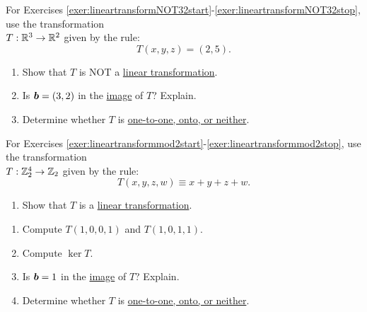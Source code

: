 \begin{multicols}{2}
\noindent For Exercises \ref{exer:lineartransformNOT32start}-\ref{exer:lineartransformNOT32stop}, use the transformation\\ $T : \mathbb{R}^3 \to \mathbb{R}^2$ given by the rule:
\[T(x, y, z) = (2,5).\] 
\begin{enumerate}[!HW!]
\item\label{exer:lineartransformNOT32start} Show that $T$ is NOT a \hyperref[def:linear]{linear transformation}.
\item Is $\boldsymbol b = (3,2)$ in the \hyperref[def:linear]{image} of $T$? Explain. 
\item\label{exer:lineartransformNOT32stop} Determine whether $T$ is \hyperref[def:injective]{one-to-one, onto, or neither}.
\end{enumerate}\columnbreak

\noindent For Exercises \ref{exer:lineartransformmod2start}-\ref{exer:lineartransformmod2stop}, use the transformation\\ $T : \mathbb{Z}_2^4 \to \mathbb{Z}_2$ given by the rule:
\[T(x, y, z, w) \equiv x+y+z+w.\] 
\begin{enumerate}[!HW!]
\item \label{exer:lineartransformmod2start}Show that $T$ is a \hyperref[def:linear]{linear transformation}.
\end{enumerate}
\begin{enumerate}[!HW!, label=$\spadesuit$ \arabic*., ref=\arabic*]
\item Compute $T(1, 0, 0, 1)$ and $T(1, 0, 1, 1)$.
\item Compute \hyperref[def:linear]{$\ker T$}.
\item Is $\boldsymbol b = 1$ in the \hyperref[def:linear]{image} of $T$? Explain. 
\item\label{exer:lineartransformmod2stop} Determine whether $T$ is \hyperref[def:injective]{one-to-one, onto, or neither}.
\end{enumerate}
\end{multicols}

